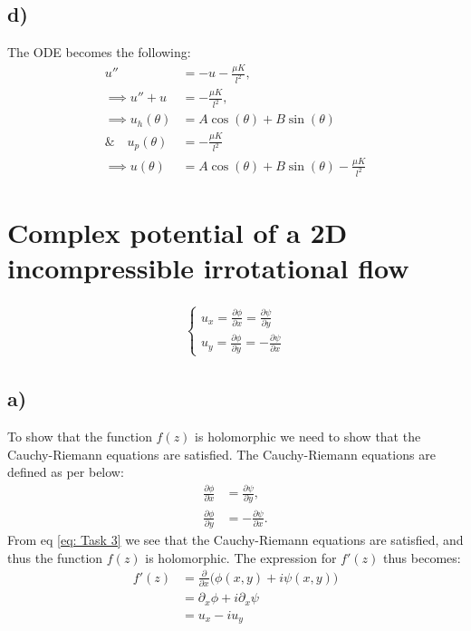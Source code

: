 \documentclass{article}
\begin{document}
\subsection*{d)}
The ODE becomes the following:
\begin{align*}
    u'' &= -u - \frac{\mu K}{l^2},\\
    \implies u'' + u &= -\frac{\mu K}{l^2},\\
    \implies u_h(\theta) &= A\cos(\theta) + B\sin(\theta)\\
    \&\quad u_p(\theta) &= -\frac{\mu K}{l^2}\\
    \implies u(\theta) &= A\cos(\theta) + B\sin(\theta) - \frac{\mu K}{l^2} 
\end{align*}
\newpage
\section{Complex potential of a 2D incompressible irrotational flow}

\begin{align}
    \begin{cases}
        u_x = \frac{\partial \phi}{\partial x} = \frac{\partial\psi}{\partial y}\\
        u_y = \frac{\partial \phi}{\partial y} = -\frac{\partial\psi}{\partial x}
    \end{cases}\label{eq: Task 3}
\end{align}
\subsection*{a)}
To show that the function $f(z)$ is holomorphic we need to show that the Cauchy-Riemann equations are satisfied. The Cauchy-Riemann equations are defined as per below:
\begin{align*}
    \frac{\partial \phi}{\partial x} &= \frac{\partial\psi}{\partial y},\\
    \frac{\partial \phi}{\partial y} &= -\frac{\partial\psi}{\partial x}.
\end{align*}From eq \eqref{eq: Task 3} we see that the Cauchy-Riemann equations are satisfied, and thus the function $f(z)$ is holomorphic.
The expression for $f'(z)$ thus becomes:
\begin{align*}
    f'(z) &= \frac{\partial}{\partial x}\Big(\phi(x,y) + i\psi(x,y)\Big)\\
    &=\partial_x\phi + i\partial_x\psi\\
    &= u_x - iu_y
\end{align*}
\end{document}
